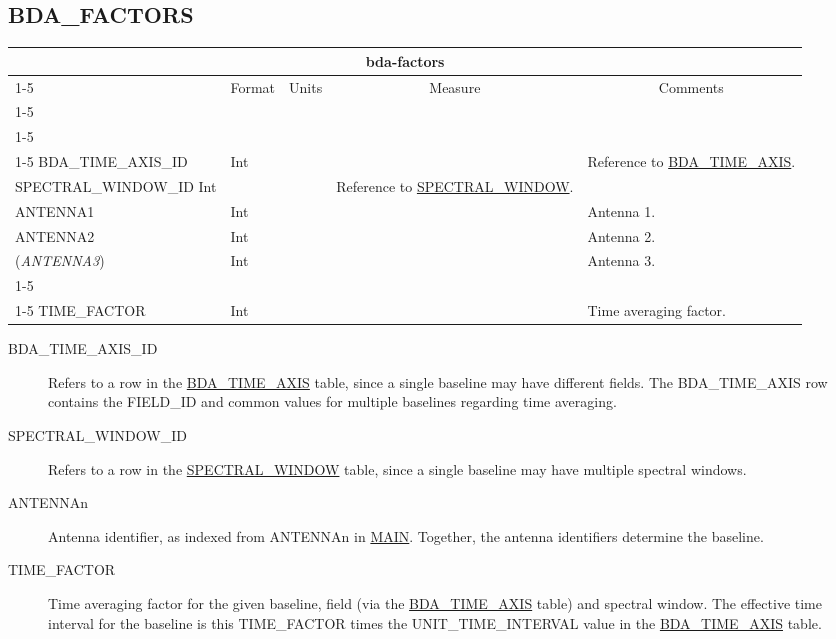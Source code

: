 \documentclass{article}
\newcommand{\defline}[1]{\cline{1-5}
\multicolumn{5}{|l|}{#1} \\
\cline{1-5}}
\newcommand{\definetable}[3][]
{
  \vfill\newpage
  \subsection{#2}
  \label{tbl:#1}
  \vspace{0.15in}
  \small
  \begin{tabular}{|l|p{1.25in}|l|p{.9in}|p{1.4in}|}
  \hline
  \multicolumn{5}{|c|}{\bf #1}\\
  \cline{1-5}
  \multicolumn{1}{|c|}{Name}&\multicolumn{1}{|c|}{Format}&
  \multicolumn{1}{|c|}{Units}&\multicolumn{1}{|c|}{Measure}&
  \multicolumn{1}{|c|}{Comments}\\
  \cline{1-5}
  #3
  \hline
  \end{tabular}
}
\begin{document}
\definetable[bda-factors]{BDA\_FACTORS}{
\defline{\bf Columns}
\defline{\em Key}
BDA\_TIME\_AXIS\_ID & Int & & &
Reference to \hyperref[tbl:bda-time-axis]{BDA\_TIME\_AXIS}.\\
SPECTRAL\_WINDOW\_ID Int & & &
Reference to \hyperref[tbl:spectral-window]{SPECTRAL\_WINDOW}.\\
ANTENNA1 & Int & & & Antenna 1.\\
ANTENNA2 & Int & & & Antenna 2.\\
({\it ANTENNA3}) & Int & & & Antenna 3.\\
\defline{\em Data}
TIME\_FACTOR & Int & & & Time averaging factor.\\
}

\begin{description}

\item[BDA\_TIME\_AXIS\_ID]
Refers to a row in the \hyperref[tbl:bda-time-axis]{BDA\_TIME\_AXIS} table,
since a single baseline may have different fields. The BDA\_TIME\_AXIS row
contains the
FIELD\_ID and common values for multiple baselines regarding time averaging.

\item[SPECTRAL\_WINDOW\_ID]
Refers to a row in the \hyperref[tbl:spectral-window]{SPECTRAL\_WINDOW} table,
since a single baseline may have multiple spectral windows.

\item[ANTENNAn]
Antenna identiﬁer, as indexed from ANTENNAn in \hyperref[tbl:main]{MAIN}.
Together, the antenna identifiers determine the baseline.

\item[TIME\_FACTOR]
Time averaging factor for the given baseline,
field (via the \hyperref[tbl:bda-time-axis]{BDA\_TIME\_AXIS} table) and
spectral window.
The effective time interval for the baseline is this TIME\_FACTOR times the
UNIT\_TIME\_INTERVAL value in the \hyperref[tbl:bda-time-axis]{BDA\_TIME\_AXIS}
table.

\end{description}
\end{document}
